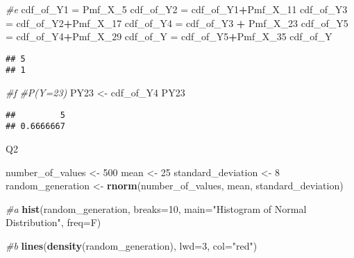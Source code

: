 \documentclass[
]{article}
\newenvironment{Shaded}{\begin{snugshade}}{\end{snugshade}}
\newcommand{\AttributeTok}[1]{\textcolor[rgb]{0.13,0.29,0.53}{#1}}
\newcommand{\CommentTok}[1]{\textcolor[rgb]{0.56,0.35,0.01}{\textit{#1}}}
\newcommand{\DecValTok}[1]{\textcolor[rgb]{0.00,0.00,0.81}{#1}}
\newcommand{\FunctionTok}[1]{\textcolor[rgb]{0.13,0.29,0.53}{\textbf{#1}}}
\newcommand{\NormalTok}[1]{#1}
\newcommand{\OtherTok}[1]{\textcolor[rgb]{0.56,0.35,0.01}{#1}}
\newcommand{\SpecialCharTok}[1]{\textcolor[rgb]{0.81,0.36,0.00}{\textbf{#1}}}
\newcommand{\StringTok}[1]{\textcolor[rgb]{0.31,0.60,0.02}{#1}}
\begin{document}
\begin{Shaded}
\begin{Highlighting}[]
\CommentTok{\#e}
\NormalTok{cdf\_of\_Y1 }\OtherTok{=}\NormalTok{ Pmf\_X\_5}
\NormalTok{cdf\_of\_Y2 }\OtherTok{=}\NormalTok{ cdf\_of\_Y1}\SpecialCharTok{+}\NormalTok{Pmf\_X\_11}
\NormalTok{cdf\_of\_Y3 }\OtherTok{=}\NormalTok{ cdf\_of\_Y2}\SpecialCharTok{+}\NormalTok{Pmf\_X\_17}
\NormalTok{cdf\_of\_Y4 }\OtherTok{=}\NormalTok{ cdf\_of\_Y3 }\SpecialCharTok{+}\NormalTok{ Pmf\_X\_23}
\NormalTok{cdf\_of\_Y5 }\OtherTok{=}\NormalTok{ cdf\_of\_Y4}\SpecialCharTok{+}\NormalTok{Pmf\_X\_29}
\NormalTok{cdf\_of\_Y }\OtherTok{=}\NormalTok{ cdf\_of\_Y5}\SpecialCharTok{+}\NormalTok{Pmf\_X\_35}
\NormalTok{cdf\_of\_Y}
\end{Highlighting}
\end{Shaded}

\begin{verbatim}
## 5 
## 1
\end{verbatim}

\begin{Shaded}
\begin{Highlighting}[]
\CommentTok{\#f}
\CommentTok{\#P(Y=23)}
\NormalTok{PY23 }\OtherTok{\textless{}{-}}\NormalTok{ cdf\_of\_Y4}
\NormalTok{PY23}
\end{Highlighting}
\end{Shaded}

\begin{verbatim}
##         5 
## 0.6666667
\end{verbatim}

Q2

\begin{Shaded}
\begin{Highlighting}[]
\NormalTok{number\_of\_values }\OtherTok{\textless{}{-}} \DecValTok{500}
\NormalTok{mean }\OtherTok{\textless{}{-}} \DecValTok{25}
\NormalTok{standard\_deviation }\OtherTok{\textless{}{-}} \DecValTok{8}
\NormalTok{random\_generation }\OtherTok{\textless{}{-}} \FunctionTok{rnorm}\NormalTok{(number\_of\_values, mean, standard\_deviation)}
\end{Highlighting}
\end{Shaded}

\begin{Shaded}
\begin{Highlighting}[]
\CommentTok{\#a}
\FunctionTok{hist}\NormalTok{(random\_generation, }\AttributeTok{breaks=}\DecValTok{10}\NormalTok{, }\AttributeTok{main=}\StringTok{"Histogram of Normal Distribution"}\NormalTok{, }\AttributeTok{freq=}\NormalTok{F)}

\CommentTok{\#b}
\FunctionTok{lines}\NormalTok{(}\FunctionTok{density}\NormalTok{(random\_generation), }\AttributeTok{lwd=}\DecValTok{3}\NormalTok{, }\AttributeTok{col=}\StringTok{"red"}\NormalTok{)}
\end{Highlighting}
\end{Shaded}
\end{document}
